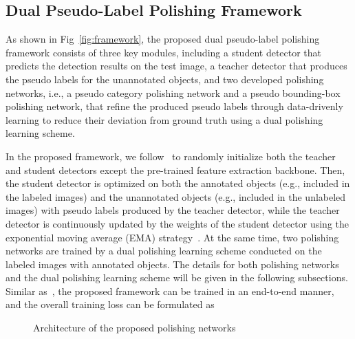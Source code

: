 \documentclass[letterpaper]{article} \usepackage{aaai23}  \usepackage{times}  \usepackage{helvet}  \usepackage{courier}  \usepackage[hyphens]{url}  \usepackage{graphicx} \urlstyle{rm} \def\UrlFont{\rm}  \usepackage{natbib}  \usepackage{caption} \frenchspacing  \setlength{\pdfpagewidth}{8.5in}  \setlength{\pdfpageheight}{11in}  \usepackage{algorithm}
\begin{document}
\subsection{Dual Pseudo-Label Polishing Framework}
As shown in Fig~\ref{fig:framework}, the proposed dual pseudo-label polishing framework consists of three key modules, including a student detector that predicts the detection results on the test image, a teacher detector that produces the pseudo labels for the unannotated objects, and two developed polishing networks, i.e., a pseudo category polishing network and a pseudo bounding-box polishing network, that refine the produced pseudo labels through data-drivenly learning to reduce their deviation from ground truth using a dual polishing learning scheme.

In the proposed framework, we follow~\cite{xu2021end} to randomly initialize both the teacher and student detectors except the pre-trained feature extraction backbone. Then, the student detector is optimized on both the annotated objects (e.g., included in the labeled images) and the unannotated objects (e.g., included in the unlabeled images) with pseudo labels produced by the teacher detector, while the teacher detector is continuously updated by the weights of the student detector using the exponential moving average (EMA) strategy~\cite{tarvainen2017mean}. At the same time, two polishing networks are trained by a dual polishing learning scheme conducted on the labeled images with annotated objects. The details for both polishing networks and the dual polishing learning scheme will be given in the following subsections. Similar as~\cite{xu2021end}, the proposed framework can be trained in an end-to-end manner, and the overall training loss can be formulated as


\begin{figure}[htbp]
\centering
\qquad{}
\caption{Architecture of the proposed polishing networks} \end{figure}
\end{document}

